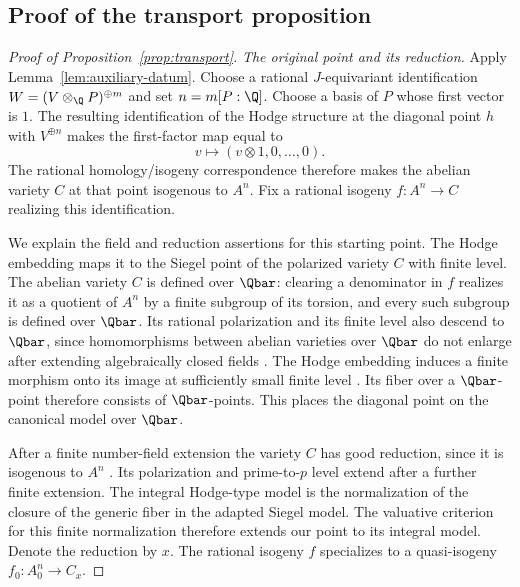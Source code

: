 \subsection{Proof of the transport proposition}

\begin{proof}[Proof of Proposition~\ref{prop:transport}]
\medskip\noindent
\emph{The original point and its reduction.}
Apply Lemma~\ref{lem:auxiliary-datum}.  Choose a rational
$J$-equivariant identification
$W=(V\otimes_\Q P)^{\oplus m}$ and set $n=m[P:\Q]$.
Choose a basis of $P$ whose first vector is $1$.  The resulting
identification of the Hodge structure at the diagonal point $h$
with $V^{\oplus n}$ makes the first-factor map equal to
\begin{equation}
 v\longmapsto(v\otimes1,0,\ldots,0).
 \label{eq:transport-first-factor}
\end{equation}
The rational homology/isogeny correspondence
\cite[Corollary~6.9]{MilneShimura} therefore makes the abelian variety
\(C\) at that point isogenous to \(A^n\). Fix a rational isogeny
\(f:A^n\to C\) realizing this identification.

We explain the field and reduction assertions for this starting
point.  The Hodge embedding maps it to the Siegel point of the
polarized variety $C$ with finite level.  The abelian variety $C$
is defined over $\Qbar$: clearing a denominator in $f$ realizes
it as a quotient of $A^n$ by a finite subgroup of its torsion, and
every such subgroup is defined over $\Qbar$.  Its rational
polarization and its finite level also descend to $\Qbar$, since
homomorphisms between abelian varieties over $\Qbar$ do not
enlarge after extending algebraically closed fields
\cite[Corollary~20.4]{MilneAV}.  The Hodge
embedding induces a finite morphism onto its
image at sufficiently small finite level
\cite[Theorem~5.16]{MilneShimura}. Its fiber over a
$\Qbar$-point therefore consists of $\Qbar$-points.  This places
the diagonal point on the canonical model over $\Qbar$.

After a finite number-field extension the variety $C$ has good
reduction, since it is isogenous to $A^n$
\cite[Chapter~IV, Theorem~3.5]{MilneAVNotes}.  Its polarization and
prime-to-$p$ level extend after a further finite extension.
The integral Hodge-type model is the normalization of the closure
of the generic fiber in the adapted Siegel model.  The valuative
criterion for this finite normalization therefore extends our
point to its integral model.  Denote the reduction by $x$.
The rational isogeny $f$ specializes to a quasi-isogeny
$f_0:A_0^n\to C_x$.


\end{proof}
